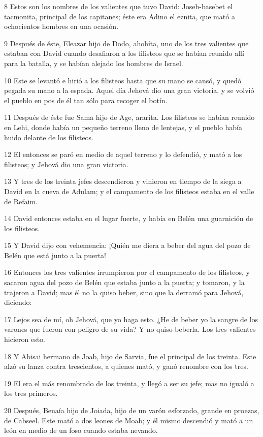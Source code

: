 \par 8 Estos son los nombres de los valientes que tuvo David: Joseb-basebet el tacmonita, principal de los capitanes; éste era Adino el eznita, que mató a ochocientos hombres en una ocasión.
\par 9 Después de éste, Eleazar hijo de Dodo, ahohíta, uno de los tres valientes que estaban con David cuando desafiaron a los filisteos que se habían reunido allí para la batalla, y se habían alejado los hombres de Israel.
\par 10 Este se levantó e hirió a los filisteos hasta que su mano se cansó, y quedó pegada su mano a la espada. Aquel día Jehová dio una gran victoria, y se volvió el pueblo en pos de él tan sólo para recoger el botín.
\par 11 Después de éste fue Sama hijo de Age, ararita. Los filisteos se habían reunido en Lehi, donde había un pequeño terreno lleno de lentejas, y el pueblo había huido delante de los filisteos.
\par 12 El entonces se paró en medio de aquel terreno y lo defendió, y mató a los filisteos; y Jehová dio una gran victoria.
\par 13 Y tres de los treinta jefes descendieron y vinieron en tiempo de la siega a David en la cueva de Adulam; y el campamento de los filisteos estaba en el valle de Refaim.
\par 14 David entonces estaba en el lugar fuerte, y había en Belén una guarnición de los filisteos.
\par 15 Y David dijo con vehemencia: ¡Quién me diera a beber del agua del pozo de Belén que está junto a la puerta!
\par 16 Entonces los tres valientes irrumpieron por el campamento de los filisteos, y sacaron agua del pozo de Belén que estaba junto a la puerta; y tomaron, y la trajeron a David; mas él no la quiso beber, sino que la derramó para Jehová, diciendo:
\par 17 Lejos sea de mí, oh Jehová, que yo haga esto. ¿He de beber yo la sangre de los varones que fueron con peligro de su vida? Y no quiso beberla. Los tres valientes hicieron esto.
\par 18 Y Abisai hermano de Joab, hijo de Sarvia, fue el principal de los treinta. Este alzó su lanza contra trescientos, a quienes mató, y ganó renombre con los tres.
\par 19 El era el más renombrado de los treinta, y llegó a ser su jefe; mas no igualó a los tres primeros.
\par 20 Después, Benaía hijo de Joiada, hijo de un varón esforzado, grande en proezas, de Cabseel. Este mató a dos leones de Moab; y él mismo descendió y mató a un león en medio de un foso cuando estaba nevando.

